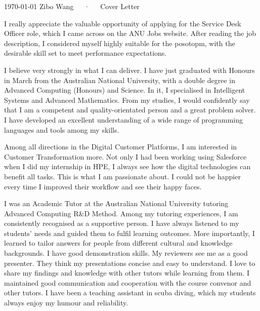 \documentclass[11pt, a4paper]{awesome-cv}
\begin{document}
\makecvheader[R]

\makecvfooter
  {\today}
  {Zibo Wang~~~·~~~Cover Letter}
  {}

\makelettertitle

\begin{cvletter}

I really appreciate the valuable opportunity of applying for the Service Desk Officer role, which I came across on the ANU Jobs website. After reading the job description, I considered myself highly suitable for the posotopm, with the desirable skill set to meet performance expectations.


I believe very strongly in what I can deliver. I have just graduated with Honours in March from the Australian National University, with a double degree in Advanced Computing (Honours) and Science. In it, I specialised in Intelligent Systems and Advanced Mathematics. From my studies, I would confidently say that I am a competent and quality-orientated person and a great problem solver. I have developed an excellent understanding of a wide range of programming languages and tools among my skills.

Among all directions in the Digital Customer Platforms, I am interested in Customer Transformation more. Not only I had been working using Salesforce when I did my internship in HPE, I always see how the digital technologies can benefit all tasks. This is what I am passionate about. I could not be happier every time I improved their workflow and see their happy faces.

I was an Academic Tutor at the Australian National University tutoring Advanced Computing R\&D Method. Among my tutoring experiences, I am consistently recognised as a supportive person. I have always listened to my students' needs and guided them to fulfil learning outcomes. More importantly, I learned to tailor answers for people from different cultural and knowledge backgrounds. I have good demonstration skills. My reviewers see me as a good presenter. They think my presentations concise and easy to understand. I love to share my findings and knowledge with other tutors while learning from them. I maintained good communication and cooperation with the course convenor and other tutors. I have been a teaching assistant in scuba diving, which my students always enjoy my humour and reliability.


\end{cvletter}
\end{document}
